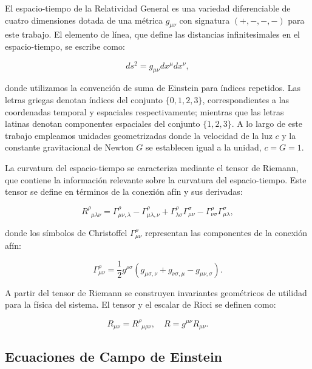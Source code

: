 El espacio-tiempo de la Relatividad General es una variedad diferenciable de cuatro dimensiones dotada de una métrica $g_{\mu\nu}$ con signatura $(+,-,-,-)$ para este trabajo. El elemento de línea, que define las distancias infinitesimales en el espacio-tiempo, se escribe como:

\begin{equation}
	ds^2 = g_{\mu\nu} dx^\mu dx^\nu,
\end{equation}

donde utilizamos la convención de suma de Einstein para índices repetidos. Las letras griegas denotan índices del conjunto $\{0,1,2,3\}$, correspondientes a las coordenadas temporal y espaciales respectivamente; mientras que las letras latinas denotan componentes espaciales del conjunto $\{1,2,3\}$. A lo largo de este trabajo empleamos unidades geometrizadas donde la velocidad de la luz $c$ y la constante gravitacional de Newton $G$ se establecen igual a la unidad, $c = G = 1$.

La curvatura del espacio-tiempo se caracteriza mediante el tensor de Riemann, que contiene la información relevante sobre la curvatura del espacio-tiempo. Este tensor se define en términos de la conexión afín y sus derivadas:

\begin{equation}
	R^\rho_{\phantom{\rho}\mu\lambda\nu} = \Gamma^\rho_{\mu\nu,\lambda} - \Gamma^\rho_{\mu\lambda,\nu} + \Gamma^\rho_{\lambda\sigma}\Gamma^\sigma_{\mu\nu} - \Gamma^\rho_{\nu\sigma}\Gamma^\sigma_{\mu\lambda},
\end{equation}

donde los símbolos de Christoffel $\Gamma^\rho_{\mu\nu}$ representan las componentes de la conexión afín:

\begin{equation}
	\Gamma^\rho_{\mu\nu} = \frac{1}{2}g^{\rho\sigma}(g_{\mu\sigma,\nu} + g_{\nu\sigma,\mu} - g_{\mu\nu,\sigma}).
\end{equation}

A partir del tensor de Riemann se construyen invariantes geométricos de utilidad para la física del sistema. El tensor y el escalar de Ricci se definen como:

\begin{equation}
	R_{\mu\nu} = R^\rho_{\phantom{\rho}\mu\rho\nu}, \quad R = g^{\mu\nu}R_{\mu\nu}.
\end{equation}

\subsection{Ecuaciones de Campo de Einstein}

